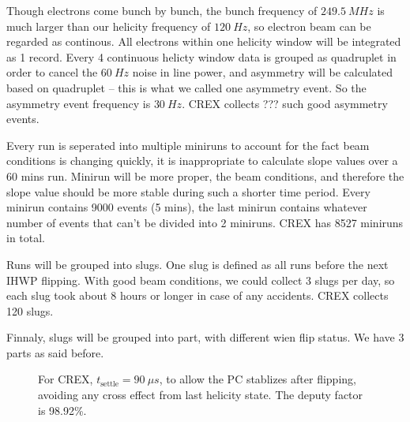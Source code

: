 Though electrons come bunch by bunch, the bunch frequency of $249.5\ MHz$ is much
larger than our helicity frequency of $120\ Hz$, so electron beam can be regarded
as continous. All electrons within one helicity window will be integrated as 1
record. Every 4 continuous helicty window data is grouped as quadruplet 
in order to cancel the $60\ Hz$ noise in line power, and asymmetry will be 
calculated based on quadruplet -- this is what we called one asymmetry event.
So the asymmetry event frequency is $30\ Hz$. CREX collects ??? such good 
asymmetry events.

Every run is seperated into multiple miniruns to account for the fact beam
conditions is changing quickly, it is inappropriate to calculate slope values
over a 60 mins run. Minirun will be more proper, the beam conditions, and therefore
the slope value should be more stable during such a shorter time period.  
Every minirun contains 9000 events (5 mins), the last minirun contains 
whatever number of events that can't be divided into 2 miniruns. 
CREX has 8527 miniruns in total.

Runs will be grouped into slugs. One slug is defined as all runs before the next
IHWP flipping. With good beam conditions, we could collect 3 slugs per day, so 
each slug took about 8 hours or longer in case of any accidents. CREX collects
120 slugs.

Finnaly, slugs will be grouped into part, with different wien flip status. We
have 3 parts as said before.
\begin{figure}
    \centering
    \caption{For CREX, $t_{\text{settle}} = 90\ \mu s$, to allow the PC stablizes
    after flipping, avoiding any cross effect from last helicity state. The 
    deputy factor is 98.92\%.}
\end{figure}

